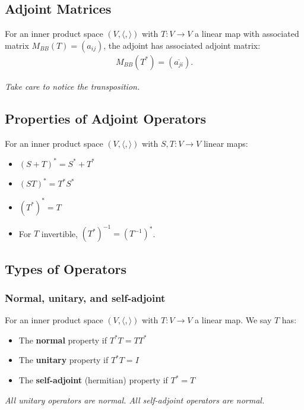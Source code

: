 \documentclass[a4paper, 12pt, twoside]{article}
\begin{document}
\subsection{Adjoint Matrices}

For an inner product space $(V, \langle , \rangle)$ with 
$T : V \to V$ a linear map with associated matrix 
$M_{BB}(T) = (a_{ij})$, the adjoint has associated adjoint matrix:
\begin{align*}
  M_{BB}(T^*) = (\overline{a_{ji}}).
\end{align*}

\textit{Take care to notice the transposition.}

\subsection{Properties of Adjoint Operators}

For an inner product space $(V, \langle , \rangle)$ with 
$S, T : V \to V$ linear maps:
\begin{itemize}
  \item $(S + T)^* = S^* + T^*$
  \item $(ST)^* = T^*S^*$
  \item $(T^*)^* = T$
  \item For $T$ invertible, $(T^*)^{-1} = (T^{-1})^*$.
\end{itemize}

\subsection{Types of Operators}

\subsubsection{Normal, unitary, and self-adjoint}

For an inner product space $(V, \langle , \rangle)$ with 
$T : V \to V$ a linear map. We say $T$ has:
\begin{itemize}
  \item The \textbf{normal} property if $T^*T = TT^*$
  \item The \textbf{unitary} property if $T^*T = I$
  \item The \textbf{self-adjoint} (hermitian) property if $T^* = T$
\end{itemize}

\textit{All unitary operators are normal. All self-adjoint operators
are normal.}
\end{document}

